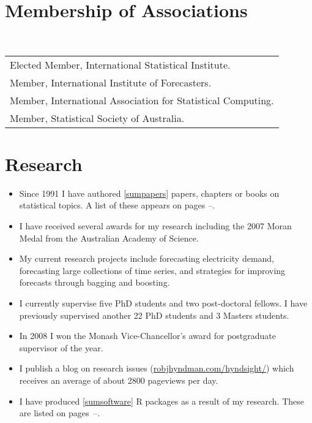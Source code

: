 \documentclass[a4paper,10pt]{article}
\begin{document}
\section{Membership of Associations}

~\begin{tabular}{@{~$\bullet$~~}l}
Elected Member, International Statistical Institute.\\
Member, International Institute of Forecasters.\\
Member, International Association for Statistical Computing.\\
Member, Statistical Society of Australia.
\end{tabular}

\section{Research}

\begin{itemize}\parskip=0cm
\item Since 1991 I have authored \ref{sumpapers} papers, chapters or books on statistical topics. A list of these appears on pages \pageref{papersstart}--\pageref{papersend}.
\item I have received several awards for my research including the 2007 Moran Medal from the Australian Academy of Science.
\item  My current research projects include forecasting electricity demand, forecasting large collections of time series, and strategies for improving forecasts through bagging and boosting.
\item I currently supervise five PhD students and two post-doctoral fellows. I have previously supervised another 22 PhD students and 3 Masters students.
\item In 2008 I won the Monash Vice-Chancellor's award for postgraduate supervisor of the year.
\item I publish a blog on research issues (\url{robjhyndman.com/hyndsight/}) which receives an average of about 2800 pageviews per day.
\item I have produced \ref{sumsoftware} R packages as a result of my research. These are listed on pages~\pageref{sumreports}--\pageref{sumsoftware}.
\end{itemize}
\end{document}
